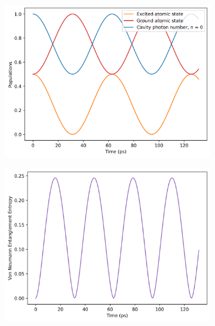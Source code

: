 \documentclass[11pt]{article}
\begin{document}
\begin{figure}[h]
    \centering
    \begin{subfigure}{0.45\textwidth}
        \centering
        \includegraphics[width=\linewidth]{Research Project/Code/results/JCM/CQS_expt_eg.png}
        \caption{}
        \label{fig:jcm_cqs_expt_eg}
    \end{subfigure}
    \hfill
    \begin{subfigure}{0.45\textwidth}
        \centering
        \includegraphics[width=\linewidth]{Research Project/Code/results/JCM/CQS_vne_eg.png}
        \caption{}
        \label{fig:jcm_cqs_vne_eg}
    \end{subfigure}
    
    \vspace{0.5cm}
    

\end{figure}
\end{document}
